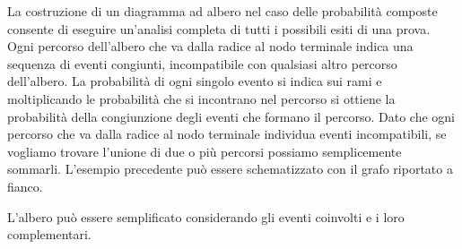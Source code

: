 \vspace{.4em}
\noindent \begin{minipage}{.39\textwidth}
 La costruzione di un diagramma ad albero nel caso delle probabilità 
composte consente di eseguire un'analisi completa di tutti i possibili esiti 
di una prova. 
Ogni percorso dell'albero che va dalla radice al nodo 
terminale indica una sequenza di eventi congiunti, incompatibile con 
qualsiasi altro percorso dell'albero. 
La probabilità di ogni singolo evento si indica sui rami e 
moltiplicando le probabilità che si incontrano nel percorso si ottiene la 
probabilità della congiunzione degli eventi che formano il percorso.
Dato che ogni percorso che va dalla radice al nodo terminale individua 
eventi incompatibili, se vogliamo trovare l'unione di due o più percorsi 
possiamo semplicemente sommarli.
L'esempio precedente può essere schematizzato con il grafo riportato a 
fianco.
\end{minipage}
\hfil
\begin{minipage}{.59\textwidth}
\begin{inaccessibleblock}
 \begin{center}
 \alberomonetadado
\end{center}
\end{inaccessibleblock}
\end{minipage}

L'albero può essere semplificato considerando gli eventi coinvolti e i loro 
complementari.

